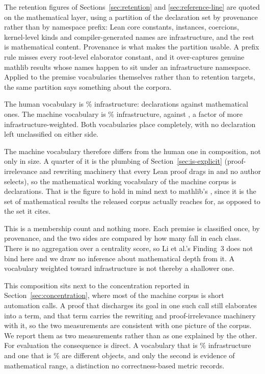 The retention figures of Sections~\ref{sec:retention} and
\ref{sec:reference-line} are quoted on the mathematical layer, using a
partition of the declaration set by provenance rather than by namespace
prefix: Lean core constants, instances, coercions, kernel-level kinds and
compiler-generated names are infrastructure, and the rest is mathematical
content. Provenance is what makes the partition usable. A prefix rule misses
every root-level elaborator constant, and it over-captures genuine mathlib
results whose names happen to sit under an infrastructure namespace.
Applied to the premise vocabularies themselves rather than to retention
targets, the same partition says something about the corpora.

The human vocabulary is \humanVocabInfraPct{}\% infrastructure:
\humanVocabInfra{} declarations against \humanVocabMath{} mathematical ones.
The machine vocabulary is \machineVocabInfraPct{}\% infrastructure,
\machineVocabInfra{} against \machineVocabMath{}, a factor of
\infraWeightRatio{} more infrastructure-weighted. Both vocabularies place
completely, with no declaration left unclassified on either side.

The machine vocabulary therefore differs from the human one in composition,
not only in size. A quarter of it is the plumbing of
Section~\ref{sec:is-explicit} (proof-irrelevance and rewriting machinery that
every Lean proof drags in and no author selects), so the mathematical working
vocabulary of the machine
corpus is \machineVocabMath{} declarations. That is the figure to hold in mind
next to mathlib's \humanVocabMath{}, since it is the set of mathematical
results the released corpus actually reaches for, as opposed to the set it
cites.

This is a membership count and nothing more. Each premise is classified once,
by provenance, and the two sides are compared by how many fall in each class.
There is no aggregation over a centrality score, so Li et al.'s Finding~3 does
not bind here and we draw no inference about mathematical depth from it. A
vocabulary weighted toward infrastructure is not thereby a shallower one.

This composition sits next to the concentration reported in
Section~\ref{sec:concentration}, where most of the machine corpus is short
automation calls. A proof that discharges its goal in one such call still
elaborates into a term, and that term carries the rewriting and
proof-irrelevance machinery with it, so the two measurements are consistent
with one picture of the corpus. We report them as two measurements rather than
as one explained by the other. For evaluation the consequence is direct. A
vocabulary that is \machineVocabInfraPct{}\% infrastructure and one that is
\humanVocabInfraPct{}\% are different objects, and only the second is evidence
of mathematical range, a distinction no correctness-based metric records.

